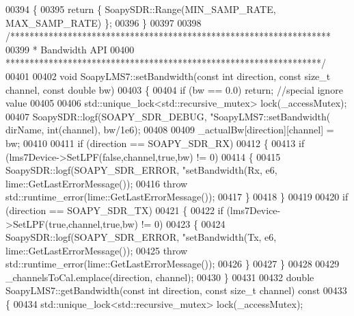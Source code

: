 \begin{DoxyCode}
{{{{{{{{{{{00394 \textcolor{keyword}{}\{
00395     \textcolor{keywordflow}{return} \{ SoapySDR::Range(MIN_SAMP_RATE, MAX_SAMP_RATE) \};
00396 \}
00397 
00398 \textcolor{comment}{/*******************************************************************}
00399 \textcolor{comment}{ * Bandwidth API}
00400 \textcolor{comment}{ ******************************************************************/}
00401 
00402 \textcolor{keywordtype}{void} SoapyLMS7::setBandwidth(\textcolor{keyword}{const} \textcolor{keywordtype}{int} direction, \textcolor{keyword}{const} \textcolor{keywordtype}{size\_t} channel, \textcolor{keyword}{const} \textcolor{keywordtype}{double} 
      bw)
00403 \{
00404     \textcolor{keywordflow}{if} (bw == 0.0) \textcolor{keywordflow}{return}; \textcolor{comment}{//special ignore value}
00405 
00406     std::unique\_lock<std::recursive\_mutex> lock(_accessMutex);
00407     SoapySDR::logf(SOAPY\_SDR\_DEBUG, \textcolor{stringliteral}{"SoapyLMS7::setBandwidth(%
      dirName, \textcolor{keywordtype}{int}(channel), bw/1e6);
00408 
00409     _actualBw[direction][channel] = bw;
00410 
00411     \textcolor{keywordflow}{if} (direction == SOAPY\_SDR\_RX)
00412     \{        
00413         \textcolor{keywordflow}{if} (lms7Device->SetLPF(\textcolor{keyword}{false},channel,\textcolor{keyword}{true},bw) != 0)
00414         \{
00415             SoapySDR::logf(SOAPY\_SDR\_ERROR, \textcolor{stringliteral}{"setBandwidth(Rx, %
      e6, lime::GetLastErrorMessage());
00416             \textcolor{keywordflow}{throw} std::runtime\_error(lime::GetLastErrorMessage());
00417         \}
00418     \}
00419 
00420     \textcolor{keywordflow}{if} (direction == SOAPY\_SDR\_TX)
00421     \{
00422         \textcolor{keywordflow}{if} (lms7Device->SetLPF(\textcolor{keyword}{true},channel,\textcolor{keyword}{true},bw) != 0)
00423         \{
00424             SoapySDR::logf(SOAPY\_SDR\_ERROR, \textcolor{stringliteral}{"setBandwidth(Tx, %
      e6, lime::GetLastErrorMessage());
00425             \textcolor{keywordflow}{throw} std::runtime\_error(lime::GetLastErrorMessage());
00426         \}
00427     \}
00428 
00429     _channelsToCal.emplace(direction, channel);
00430 \}
00431 
00432 \textcolor{keywordtype}{double} SoapyLMS7::getBandwidth(\textcolor{keyword}{const} \textcolor{keywordtype}{int} direction, \textcolor{keyword}{const} \textcolor{keywordtype}{size\_t} channel)\textcolor{keyword}{ const}
00433 \textcolor{keyword}{}\{
00434     std::unique\_lock<std::recursive\_mutex> lock(_accessMutex);
}}}}}}}}}}}}}}
\end{DoxyCode}
